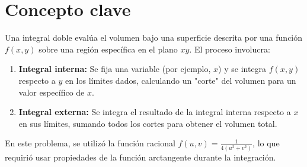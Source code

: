 \section*{Concepto clave}

Una integral doble evalúa el volumen bajo una superficie descrita por una función \( f(x, y) \) sobre una región específica en el plano \( xy \). El proceso involucra:

\begin{enumerate}
    \item \textbf{Integral interna:} Se fija una variable (por ejemplo, \( x \)) y se integra \( f(x, y) \) respecto a \( y \) en los límites dados, calculando un "corte" del volumen para un valor específico de \( x \).
    \item \textbf{Integral externa:} Se integra el resultado de la integral interna respecto a \( x \) en sus límites, sumando todos los cortes para obtener el volumen total.
\end{enumerate}

En este problema, se utilizó la función racional \( f(u, v) = \frac{1}{4(u^2 + v^2)} \), lo que requirió usar propiedades de la función arctangente durante la integración.

